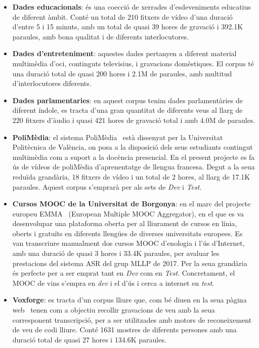 \begin{itemize}
    \item \textbf{Dades educacionals}: és una co\lgem ecció de xerrades d'esdeveniments educatius de diferent àmbit. Conté un total de 210 fitxers de vídeo d'una duració d'entre 5 i 15 minuts, amb un total de quasi 39 hores de gravació i 392.1K paraules, amb bona qualitat i de diferents interlocutores.

    \item \textbf{Dades d'entreteniment}: aquestes dades pertanyen a diferent material multimèdia d'oci, continguts televisius, i gravacions domèstiques.
        El corpus té una duració total de quasi 200 hores i 2.1M de paraules, amb multitud d'interlocutores diferents.
    
    \item \textbf{Dades parlamentaries}: en aquest corpus tenim dades parlamentàries de diferent índole, es tracta d'una gran quantitat de diferents veus al llarg de 220 fitxers d'àudio i quasi 421 hores de gravació total i amb 4.0M de paraules.
    
    \item \textbf{PoliMèdia}: el sistema PoliMèdia~\cite{polimedia} està dissenyat per la Universitat Politècnica de València, on posa a la disposició dels seus estudiants contingut multimèdia com a suport a la docència presencial.
        En el present projecte es fa ús de vídeos de poliMèdia d'aprenentatge de llengua francesa. 
        Degut a la seua reduïda grandària, 18 fitxers de vídeo i un total de 2 hores, al llarg de 17.1K paraules. Aquest corpus s'emprarà per als sets de \textit{Dev} i \textit{Test}.
    
    \item \guillemotleft \textbf{Cursos MOOC de la Universitat de Borgonya}\guillemotright: en el marc del projecte europeu EMMA~\cite{emma_project} (European Multiple MOOC Aggregator), en el que es va desenvolupar una plataforma oberta per al lliurament de cursos en línia, oberts i gratuïts en diferents llengües de diverses universitats europees. 
Es van transcriure manualment dos cursos MOOC d'enologia i l'ús d'Internet, amb una duració de quasi 3 hores i 33.4K paraules, per avaluar les prestacions del sistema ASR del grup MLLP de 2017. 
Per la seua grandària és perfecte per a ser emprat tant en \textit{Dev} com en \textit{Test}.
Concretament, el MOOC de vins s'empra en \textit{dev} i el d'ús i cerca a internet en \textit{test}.
    
    \item \textbf{Voxforge}: es tracta d'un corpus lliure que, com bé diuen en la seua pàgina web~\cite{voxforge} tenen com a objectiu \guillemotleft recollir gravacions de veu amb la seua corresponent transcripció, per a ser utilitzades amb motors de reconeixement de veu de codi lliure\guillemotright.
        Conté 1631 mostres de diferents persones amb una duració total de quasi 27 hores i 134.6K paraules. 
\end{itemize}

